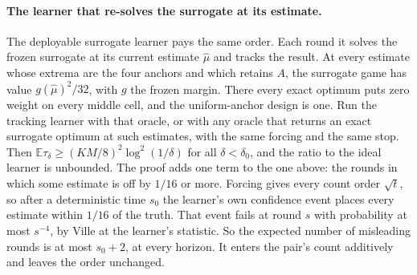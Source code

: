 \paragraph{The learner that re-solves the surrogate at its estimate.}
The deployable surrogate learner pays the same order. Each round it solves the frozen
surrogate at its current estimate $\hat\mu$ and tracks the result. At every estimate whose
extrema are the four anchors and which retains $A$, the surrogate game has value
$g(\hat\mu)^{2}/32$, with $g$ the frozen margin. There every exact optimum puts zero weight on
every middle cell, and the uniform-anchor design is one. Run the tracking learner with that
oracle, or with any oracle that returns an exact surrogate optimum at such estimates, with
the same forcing and the same stop. Then
$\mathbb{E}\tau_{\delta}\ge(KM/8)^{2}\log^{2}(1/\delta)$ for all $\delta<\delta_{0}$, and the ratio
to the ideal learner is unbounded. The proof adds one term to the one above: the rounds in
which some estimate is off by $1/16$ or more. Forcing gives every count order $\sqrt t$, so
after a deterministic time $s_{0}$ the learner's own confidence event places every estimate
within $1/16$ of the truth. That event fails at round $s$ with probability at most $s^{-4}$,
by Ville at the learner's statistic. So the expected number of misleading rounds is at most
$s_{0}+2$, at every horizon. It enters the pair's count additively and leaves the order
unchanged.



